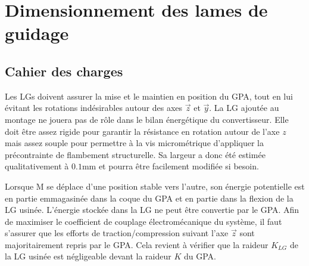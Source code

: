\section{Dimensionnement des lames de guidage}
\label{sec:3.2:Dimensionnement des lames de guidage}
	\subsection{Cahier des charges}
	\label{subsec:3.2.2:Cahier des charges}
Les LGs doivent assurer la mise et le maintien en position du GPA, tout en lui évitant les rotations indésirables autour des axes $\vec{z}$ et $\vec{y}$. La LG ajoutée au montage ne jouera pas de rôle dans le bilan énergétique du convertisseur. Elle doit être assez rigide pour garantir la résistance en rotation autour de l'axe $z$ mais assez souple pour permettre à la vis micrométrique d'appliquer la précontrainte de flambement structurelle. Sa largeur a donc été estimée qualitativement à $0.1$mm et pourra être facilement modifiée si besoin.

Lorsque M se déplace d'une position stable vers l'autre, son énergie potentielle est en partie emmagasinée dans la coque du GPA et en partie dans la flexion de la LG usinée. L'énergie stockée dans la LG ne peut être convertie par le GPA. Afin de maximiser le coefficient de couplage électromécanique du système, il faut s'assurer que les efforts de traction/compression suivant l'axe $\vec{z}$ sont majoritairement repris par le GPA. Cela revient à vérifier que la raideur $K_{LG}$ de la LG usinée est négligeable devant la raideur $K$ du GPA.
